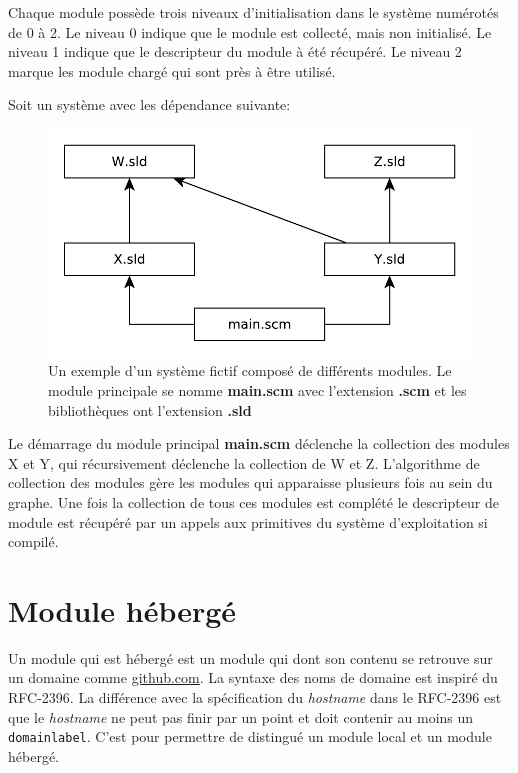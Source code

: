Chaque module possède trois niveaux d'initialisation dans le système numérotés de
0 à 2. Le niveau 0 indique que le module est collecté, mais non initialisé. Le
niveau 1 indique que le descripteur du module à été récupéré. Le niveau 2 marque
les module chargé qui sont près à être utilisé.

Soit un système avec les dépendance suivante:
\begin{figure}[ht]
  \includegraphics{figures/system-example}
  \caption{Un exemple d'un système fictif composé de différents modules.
  Le module principale se nomme \textbf{main.scm} avec l'extension \textbf{.scm}
  et les bibliothèques ont l'extension \textbf{.sld}}
\end{figure} %


Le démarrage du module principal \textbf{main.scm} déclenche la collection des
modules X et Y, qui récursivement déclenche la collection de W et Z.
L'algorithme de collection des modules gère les modules qui apparaisse
plusieurs fois au sein du graphe.  Une fois la collection de tous ces modules
est complété le descripteur de module est récupéré par un appels aux primitives
du système d'exploitation si compilé.


\section{Module hébergé}

Un module qui est hébergé est un module qui dont son contenu
se retrouve sur un domaine comme \url{github.com}. La syntaxe
des noms de domaine est inspiré du RFC-2396.
La différence avec la spécification du \textit{hostname} dans le RFC-2396
est que le \textit{hostname} ne peut pas finir par un point et doit contenir
au moins un \verb|domainlabel|. C'est pour permettre de distingué
un module local et un module hébergé. \\

